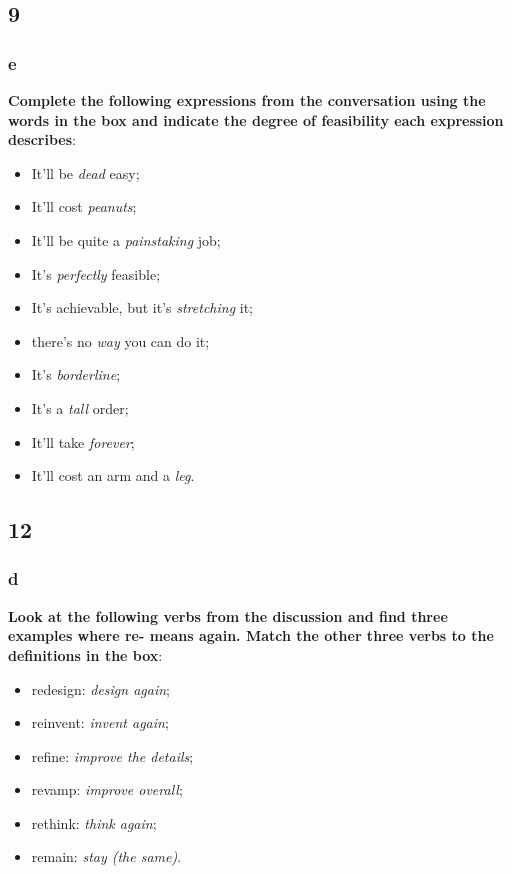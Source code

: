 \subsection{9}

\subsubsection{e}

\textbf{Complete the following expressions from the conversation using the words in the box and indicate the degree of feasibility each expression describes}:

\begin{itemize}

\item It'll be \textit{dead} easy;
\item It'll cost \textit{peanuts};
\item It'll be quite a \textit{painstaking} job;
\item It's \textit{perfectly} feasible;
\item It's achievable, but it's \textit{stretching} it;
\item there's no \textit{way} you can do it;
\item It's \textit{borderline};
\item It's a \textit{tall} order;
\item It'll take \textit{forever};
\item It'll cost an arm and a \textit{leg}.

\end{itemize}

\subsection{12}

\subsubsection{d}

\textbf{Look at the following verbs from the discussion and find three examples where re- means again. Match the other three verbs to the definitions in the box}:

\begin{itemize}

\item redesign: \textit{design again};
\item reinvent: \textit{invent again};
\item refine: \textit{improve the details};
\item revamp: \textit{improve overall};
\item rethink: \textit{think again};
\item remain: \textit{stay (the same)}.

\end{itemize}

